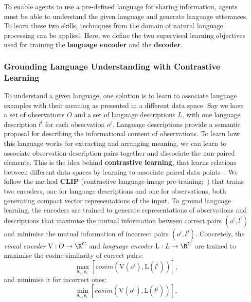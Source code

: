To enable agents to use a pre-defined language for sharing information, agents must be able to understand the given language and generate language utterances. To learn these two skills, techniques from the domain of natural language processing can be applied. Here, we define the two supervised learning objectives used for training the \textbf{language encoder} and the \textbf{decoder}. 


\subsubsection{Grounding Language Understanding with Contrastive Learning}\label{sec:LAMAC:CLIP}

To understand a given language, one solution is to learn to associate language examples with their meaning as presented in a different data space. Say we have a set of observations $O$ and a set of language descriptions $L$, with one language description $l^i$ for each observation $o^i$. Language descriptions provide a semantic proposal for describing the informational content of observations. To learn how this language works for extracting and arranging meaning, we can learn to associate observation-description pairs together and dissociate the non-paired elements. This is the idea behind \textbf{contrastive learning}, that learns relations between different data spaces by learning to associate paired data points~\citep{Oord2018_Contrastive, Tian2020_Contrastive}. We follow the method \textbf{CLIP} (contrastive language-image pre-training;~\cite{Radford2021_CLIP}) that trains two encoders, one for language descriptions and one for observations, both generating compact vector representations of the input. To ground language learning, the encoders are trained to generate representations of observations and descriptions that maximise the mutual information between correct pairs $(o^i, l^i)$ and minimise the mutual information of incorrect pairs $(o^i, l^j)$. Concretely, the \textit{visual encoder} $\mathrm{V}:O\rightarrow\R^C$ and \textit{language encoder} $\mathrm{L}:L\rightarrow\R^C$ are trained to maximise the cosine similarity of correct pairs:
\begin{equation}
    \max_{\theta_\mathrm{V},\theta_\mathrm{L}}\left[cosim(\mathrm{V}(o^i),\mathrm{L}(l^i))\right],
\end{equation}
and minimise it for incorrect ones: 
\begin{equation}
    \min_{\theta_\mathrm{V},\theta_\mathrm{L}}\left[cosim(\mathrm{V}(o^i),\mathrm{L}(l^j))\right],
\end{equation}
